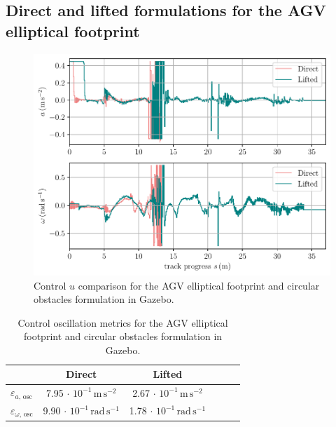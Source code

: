 \subsection{Direct and lifted formulations for the AGV elliptical footprint}

\begin{figure}[h!tb]
    \includegraphics[width=1\textwidth]{figures/experiments/u_2c}
    \caption{Control $u$ comparison for the \ac{AGV} elliptical footprint and circular obstacles formulation in Gazebo.}  \label{fig_comp_u_2c}
\end{figure}

\begin{table}[h!tb]
    \small
	\begin{center}
        \begin{tabular}{lccccl}\toprule
		    & \textbf{Direct} & \textbf{Lifted}\\
            \midrule
            $\varepsilon_{a,\,\mathrm{osc}} $ & 7.95 $\cdot$ $10^{-1}\,\mathrm{m\,s^{-2}}$& 2.67 $\cdot$ $10^{-1}\,\mathrm{m\,s^{-2}}$\\
            $\varepsilon_{\omega,\,\mathrm{osc}} $ & 9.90 $\cdot$ $10^{-1}\,\mathrm{rad\,s^{-1}}$& 1.78 $\cdot$ $10^{-1}\,\mathrm{rad\,s^{-1}}$\\
		    \bottomrule
		\end{tabular}
	\end{center}
    \caption{Control oscillation metrics for the \ac{AGV} elliptical footprint and circular obstacles formulation in Gazebo.}
    \label{tab_u_osc_2c}
\end{table}

